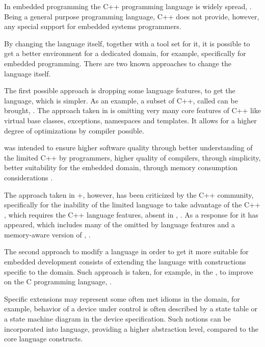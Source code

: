 

In embedded programming the C++ programming language is widely spread, \cite{embedlangs}. Being a general purpose 
programming language, C++ does not provide, however, any special support for embedded systems programmers. 

By changing  the language itself, together with a tool set for it, it is possible to get a better environment 
for a dedicated domain, for example, specifically for embedded programming. There are two known approaches to change
the language itself.

The first possible approach is dropping some language features, to get the language, which is simpler. 
As an example, a subset of C++, called  can be brought, \cite{emcpp}. The approach taken in  is 
omitting very many core features of C++ like virtual base classes, exceptions, namespaces and templates. 
It allows for a higher degree of optimizations by compiler possible. 

 was intended to ensure higher software quality through better understanding of the limited 
C++ by programmers, higher quality of compilers, through simplicity, better suitability for the embedded domain, through
memory consumption considerations \cite{stripepp}. 

The approach taken in +, however, has been criticized by the C++ community, specifically for the inability of the 
limited language to take advantage of the C++ , which requires the C++ language features, absent in 
, \cite{stremcpp}. As a response for it  has appeared, which includes many of the omitted by
 language features and a memory-aware version of , \cite{extendedembeddedcpp}.

The second approach to modify a language in order to get it more suitable for embedded development consists of extending 
the language with constructions specific to the domain. Such approach is taken, for example, in the , to improve on
the C programming language, \cite{2012_voelter_mbeddr_extensible_c_based_language_and_ide_for_embedded}. 

Specific extensions may represent some often met idioms in the domain, for example, behavior of a device under control
is  often described by a state table or a state machine diagram in the device specification. 
Such notions can be incorporated into language, providing a higher abstraction level, compared to the core 
language constructs. 

